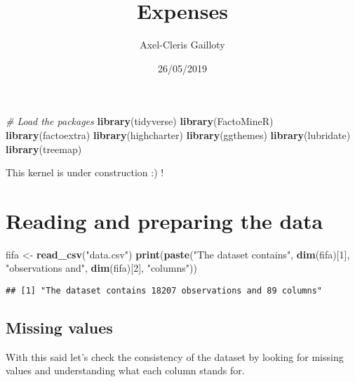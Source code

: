 \documentclass[]{article}
\title{Expenses}
\author{Axel-Cleris Gailloty}
\date{26/05/2019}
\newenvironment{Shaded}{\begin{snugshade}}{\end{snugshade}}
\newcommand{\CommentTok}[1]{\textcolor[rgb]{0.56,0.35,0.01}{\textit{#1}}}
\newcommand{\DecValTok}[1]{\textcolor[rgb]{0.00,0.00,0.81}{#1}}
\newcommand{\KeywordTok}[1]{\textcolor[rgb]{0.13,0.29,0.53}{\textbf{#1}}}
\newcommand{\NormalTok}[1]{#1}
\newcommand{\StringTok}[1]{\textcolor[rgb]{0.31,0.60,0.02}{#1}}
\begin{document}
\maketitle

\begin{Shaded}
\begin{Highlighting}[]
\CommentTok{# Load the packages }
\KeywordTok{library}\NormalTok{(tidyverse)}
\KeywordTok{library}\NormalTok{(FactoMineR)}
\KeywordTok{library}\NormalTok{(factoextra)}
\KeywordTok{library}\NormalTok{(highcharter)}
\KeywordTok{library}\NormalTok{(ggthemes)}
\KeywordTok{library}\NormalTok{(lubridate)}
\KeywordTok{library}\NormalTok{(treemap)}
\end{Highlighting}
\end{Shaded}

This kernel is under construction :) !

\hypertarget{reading-and-preparing-the-data}{%
\section{Reading and preparing the
data}\label{reading-and-preparing-the-data}}

\begin{Shaded}
\begin{Highlighting}[]
\NormalTok{fifa <-}\StringTok{ }\KeywordTok{read_csv}\NormalTok{(}\StringTok{"data.csv"}\NormalTok{)}
\KeywordTok{print}\NormalTok{(}\KeywordTok{paste}\NormalTok{(}\StringTok{"The dataset contains"}\NormalTok{, }\KeywordTok{dim}\NormalTok{(fifa)[}\DecValTok{1}\NormalTok{], }\StringTok{"observations and"}\NormalTok{, }\KeywordTok{dim}\NormalTok{(fifa)[}\DecValTok{2}\NormalTok{], }\StringTok{"columns"}\NormalTok{))}
\end{Highlighting}
\end{Shaded}

\begin{verbatim}
## [1] "The dataset contains 18207 observations and 89 columns"
\end{verbatim}

\hypertarget{missing-values}{%
\subsection{Missing values}\label{missing-values}}

With this said let's check the consistency of the dataset by looking for
missing values and understanding what each column stands for.
\end{document}
